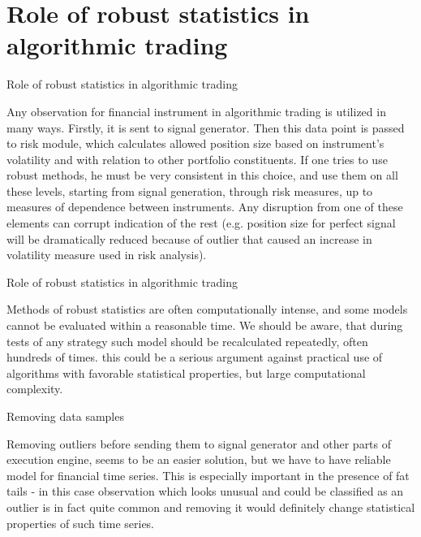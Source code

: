 \documentclass{beamer}
\begin{document}
\section{Role of robust statistics in  algorithmic trading}
\begin{frame}{Role of robust statistics in  algorithmic trading}

Any observation for financial instrument in algorithmic trading is utilized in many ways. Firstly, it is sent to signal generator. Then this data point is passed to risk module, which calculates allowed position size based on instrument’s volatility and with relation to other portfolio constituents. If one tries to use robust methods, he must be very consistent in this choice, and use them on all these levels, starting from signal generation, through risk measures, up to measures of dependence between instruments. Any disruption from one of these elements can corrupt indication of the rest (e.g. position size for perfect signal will be dramatically reduced because of outlier that caused an increase in volatility measure used in risk analysis).

\end{frame}

\begin{frame}{Role of robust statistics in  algorithmic trading}

Methods of robust statistics are often computationally intense, and some models cannot be evaluated within a reasonable time. We should be aware, that during tests of any strategy such model should be recalculated repeatedly, often hundreds of times. this could be a serious argument against practical use of algorithms with favorable statistical properties, but large computational complexity.

\end{frame}

\begin{frame}{Removing data samples}

Removing outliers before sending them to signal generator and other parts of execution engine, seems to be an easier solution, but we have to have reliable model for financial time series. This is especially important in the presence of fat tails - in this case observation which looks unusual and could be classified as an outlier is in fact quite common and removing it would definitely change statistical properties of such time series.

\end{frame}
\end{document}
